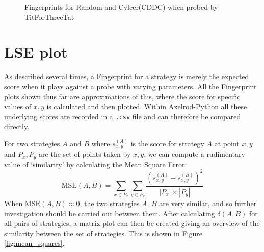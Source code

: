 \begin{figure}[htbp!]
    \centering
    \caption{Fingerprints for Random and Cylcer(CDDC) when probed by TitForThreeTat}
    \label{fig:rand_cycle_tf3t}
\end{figure}



\section{LSE plot}\label{sec:lse}

As described several times, a Fingerprint for a strategy is merely the expected score when it plays against a probe with varying parameters.
All the Fingerprint plots shown thus far are approximations of this, where the score for specific values of $x, y$ is calculated and then plotted.
Within Axelrod-Python all these underlying scores are recorded in a \texttt{.csv} file and can therefore be compared directly.

For two strategies $A$ and $B$ where $s_{x, y}^{(A)}$ is the score for strategy $A$ at point $x, y$ and $P_x, P_y$ are the set of points taken by $x, y$, we can compute a rudimentary value of `similarity' by calculating the Mean Square Error:
$$
\text{MSE}(A, B) = \sum_{x \in P_x} \sum_{y \in P_y} \frac{(s_{x, y}^{(A)} - s_{x, y}^{(B)})^2}{|P_x|\times|P_y|}
$$
When $\text{MSE}(A, B) \approx 0$, the two strategies $A$, $B$ are very similar, and so further investigation should be carried out between them.
After calculating $\delta(A, B)$ for all pairs of strategies, a matrix plot can then be created giving an overview of the similarity between the set of strategies.
This is shown in Figure \ref{fig:mean_squares}.

